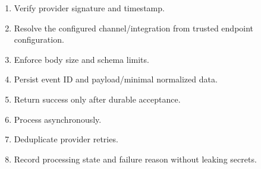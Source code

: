 \begin{enumerate}
\item Verify provider signature and timestamp.
\item Resolve the configured channel/integration from trusted endpoint configuration.
\item Enforce body size and schema limits.
\item Persist event ID and payload/minimal normalized data.
\item Return success only after durable acceptance.
\item Process asynchronously.
\item Deduplicate provider retries.
\item Record processing state and failure reason without leaking secrets.
\end{enumerate}


